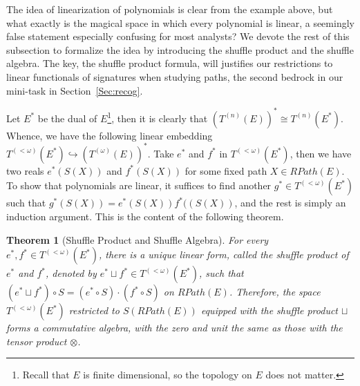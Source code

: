 \documentclass[fleqn]{article}
\newtheorem{thm}{Theorem}[section]
\theoremstyle{definition}
\theoremstyle{remark}
\begin{document}
\par
The idea of linearization of polynomials is clear from the example above, but what exactly is the magical space in which every polynomial is linear, a seemingly false statement especially confusing for most analysts? We devote the rest of this subsection to formalize the idea by introducing the shuffle product and the shuffle algebra. The key, the shuffle product formula, will justifies our restrictions to linear functionals of signatures when studying paths, the second bedrock in our mini-task in Section~\ref{Sec:recog}.

\par
Let $E^*$ be the dual of $E$\footnote{Recall that $E$ is finite dimensional, so the topology on $E$ does not matter.}, then it is clearly that $\left(T^{(n)}(E)\right)^* \cong T^{(n)}(E^*)$. Whence, we have the following linear embedding $T^{(<\omega)}(E^*) \hookrightarrow \left(T^{(\omega)}(E)\right)^*$. Take $e^*$ and $f^*$ in $T^{(<\omega)}(E^*)$, then we have two reals $e^*(S(X))$ and $f^*(S(X))$ for some fixed path $X\in RPath(E)$. To show that polynomials are linear, it suffices to find another $g^*\in T^{(<\omega)}(E^*)$ such that $g^*(S(X))=e^*(S(X)) f^*((S(X))$, and the rest is simply an induction argument. This is the content of the following theorem.
\begin{thm}[Shuffle Product and Shuffle Algebra]
For every $e^*, f^* \in T^{(<\omega)}(E^*)$, there is a unique linear form, called the shuffle product of $e^*$ and $f^*$, denoted by ${e^*\sqcup f^* \in T^{(<\omega)}(E^*)}$, such that $\left(e^*\sqcup f^*\right)\circ S = \left(e^* \circ S\right)\cdot \left(f^* \circ S\right)$ on $RPath(E)$. Therefore, the space $T^{(<\omega)}(E^*)$ restricted to $S(RPath(E))$ equipped with the shuffle product $\sqcup$ forms a commutative algebra, with the zero and unit the same as those with the tensor product $\otimes$.
\end{thm}
\end{document}
